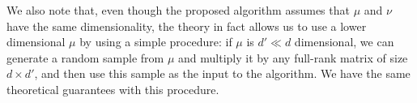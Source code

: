 We also note that, even though the proposed algorithm assumes that $\mu$ and $\nu$ have the same dimensionality, the theory in fact allows us to use a lower dimensional $\mu$ by using a simple procedure: if $\mu$ is $d' \ll d$ dimensional, we can generate a random sample from $\mu$ and multiply it by any full-rank matrix of size $d \times d'$, and then use this sample as the input to the algorithm. We have the same theoretical guarantees with this procedure. 
%
%
%



